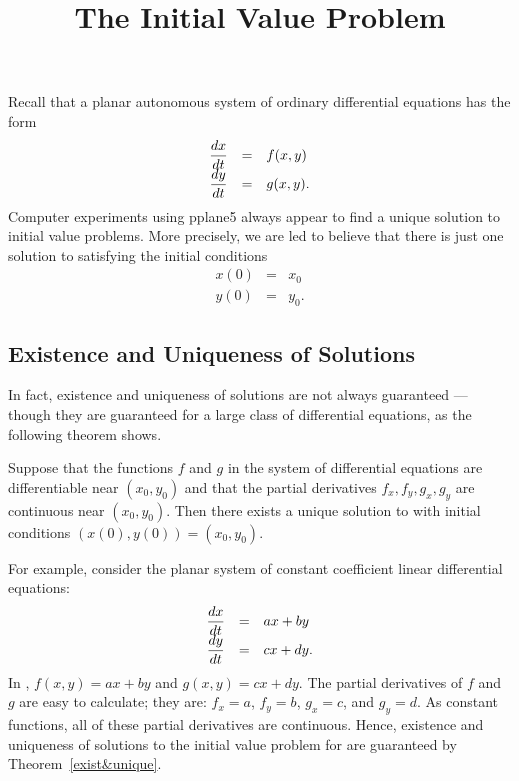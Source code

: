 \documentclass{ximera}
\title{The Initial Value Problem}
\begin{document}
\begin{abstract}
\end{abstract}
\maketitle

\label{S:6.1}

Recall that a planar autonomous  system of
ordinary differential equations has the form
\arraystart
\begin{equation}  \label{2dsystem}
\begin{array}{ccl}
\displaystyle \frac{dx}{dt}  & = & f(x,y) \\
\displaystyle \frac{dy}{dt}  & = & g(x,y).
\end{array}
\end{equation}
\arrayfinish
Computer experiments using {\sf pplane5} always appear to find a unique
solution to initial value problems.  More precisely, we are led to
believe that there is just one solution to  satisfying
the initial conditions
\begin{eqnarray*}
x(0) & = & x_0 \\
y(0) & = & y_0.
\end{eqnarray*}

\subsection*{Existence and Uniqueness of Solutions}

In fact, existence  and uniqueness
of solutions  are not always guaranteed
--- though they are guaranteed for a large class of differential
equations, as the following theorem shows.

\begin{thm}  \label{exist&unique}
Suppose that the functions $f$ and $g$ in the system of
differential equations  are differentiable near
$(x_0,y_0)$ and that the partial derivatives $f_x,f_y,g_x,g_y$
are continuous near $(x_0,y_0)$.  Then there exists a unique
solution to  with initial conditions
$(x(0),y(0))=(x_0,y_0)$.
\end{thm} 

For example, consider the planar system of constant coefficient linear
differential equations:
\arraystart
\begin{equation}  \label{2dlinsystem}
\begin{array}{ccl}
\displaystyle \frac{dx}{dt}  & = & ax+by \\
\displaystyle \frac{dy}{dt}  & = & cx+dy.
\end{array}
\end{equation}
\arrayfinish
In , $f(x,y)=ax+by$ and $g(x,y)=cx+dy$.  The partial
derivatives of $f$ and $g$ are easy to calculate; they are: $f_x=a$, $f_y=b$,
$g_x=c$, and $g_y=d$.  As constant functions, all of these partial
derivatives are continuous.  Hence, existence and uniqueness of solutions to
the initial value problem for  are guaranteed by
Theorem~\ref{exist&unique}.
\end{document}
